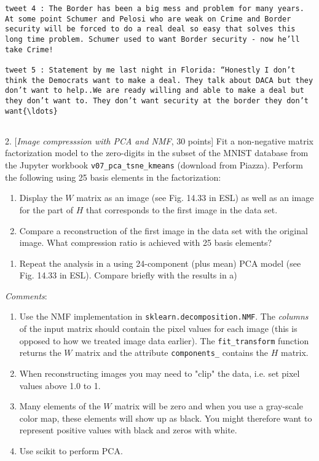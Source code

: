 \documentclass[11pt]{article}
\providecommand{\tightlist}{%
      \setlength{\itemsep}{0pt}\setlength{\parskip}{0pt}}
\begin{document}
\begin{Verbatim}[commandchars=\\\{\}]
tweet 4 : The Border has been a big mess and problem for many years. At some point Schumer and Pelosi who are weak on Crime and Border security will be forced to do a real deal so easy that solves this long time problem. Schumer used to want Border security - now he’ll take Crime! 

tweet 5 : Statement by me last night in Florida: “Honestly I don’t think the Democrats want to make a deal. They talk about DACA but they don’t want to help..We are ready willing and able to make a deal but they don’t want to. They don’t want security at the border they don’t want{\ldots} 


    \end{Verbatim}

    2. {[}\emph{Image compresssion with PCA and NMF}, 30 points{]} Fit a
non-negative matrix factorization model to the zero-digits in the subset
of the MNIST database from the Jupyter workbook
\texttt{v07\_pca\_tsne\_kmeans} (download from Piazza). Perform the
following using 25 basis elements in the factorization:

\begin{enumerate}
\def\labelenumi{\roman{enumi})}
\item
  Display the \(W\) matrix as an image (see Fig. 14.33 in ESL) as well
  as an image for the part of \(H\) that corresponds to the first image
  in the data set.
\item
  Compare a reconstruction of the first image in the data set with the
  original image. What compression ratio is achieved with 25 basis
  elements?
\end{enumerate}

\begin{enumerate}
\def\labelenumi{\alph{enumi})}
\setcounter{enumi}{1}
\tightlist
\item
  Repeat the analysis in a using 24-component (plus mean) PCA model (see
  Fig. 14.33 in ESL). Compare briefly with the results in a)
\end{enumerate}

\emph{Comments}:

\begin{enumerate}
\def\labelenumi{\arabic{enumi})}
\item
  Use the NMF implementation in \texttt{sklearn.decomposition.NMF}. The
  \emph{columns} of the input matrix should contain the pixel values for
  each image (this is opposed to how we treated image data earlier). The
  \texttt{fit\_transform} function returns the \(W\) matrix and the
  attribute \texttt{components\_} contains the \(H\) matrix.
\item
  When reconstructing images you may need to "clip" the data, i.e. set
  pixel values above 1.0 to 1.
\item
  Many elements of the \(W\) matrix will be zero and when you use a
  gray-scale color map, these elements will show up as black. You might
  therefore want to represent positive values with black and zeros with
  white.
\item
  Use scikit to perform PCA.
\end{enumerate}
\end{document}

